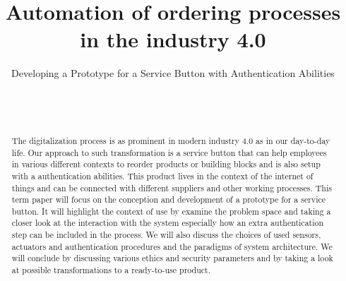 \documentclass{sigchi}
\def\plaintitle{Automation of ordering processes in the industry 4.0}
\def\plainsubtitle{Developing a Prototype for a Service Button with Authentication Abilities}
\begin{document}
\title{\plaintitle}
\subtitle{\plainsubtitle}

\author{%
  \\
  \\
}



\maketitle

\begin{abstract}
    The digitalization process is as prominent in modern industry 4.0 as in our day-to-day life. Our approach to such transformation is a service button that can help employees in various different contexts to reorder products or building blocks and is also setup with a authentication abilities. This product lives in the context of the internet of things and can be connected with different suppliers and other working processes. This term paper will focus on the conception and development of a prototype for a service button. It will highlight the context of use by examine the problem space and taking a closer look at the interaction with the system especially how an extra authentication step can be included in the process. We will also discuss the choices of used sensors, actuators and authentication procedures and the paradigms of system architecture. We will conclude by discussing various ethics and security parameters and by taking a look at possible transformations to a ready-to-use product.
\end{abstract}
\end{document}
